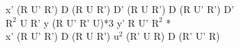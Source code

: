 x' (R U' R') D (R U R') D' (R U R') D (R U' R') D'\\
$\text{R}^2$ U R' y (R U' R' U)*3 y' R U' $\text{R}^2$ *\\
x' (R U' R') D (R U R') $\text{u}^2$ (R' U R) D (R' U' R)\\
